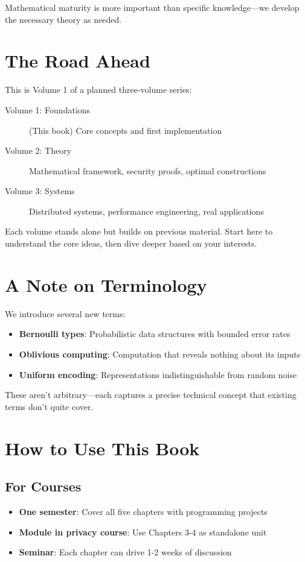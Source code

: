 Mathematical maturity is more important than specific knowledge—we develop the necessary theory as needed.

\section*{The Road Ahead}

This is Volume 1 of a planned three-volume series:

\begin{description}
\item[Volume 1: Foundations] (This book) Core concepts and first implementation
\item[Volume 2: Theory] Mathematical framework, security proofs, optimal constructions
\item[Volume 3: Systems] Distributed systems, performance engineering, real applications
\end{description}

Each volume stands alone but builds on previous material. Start here to understand the core ideas, then dive deeper based on your interests.

\section*{A Note on Terminology}

We introduce several new terms:
\begin{itemize}
\item \textbf{Bernoulli types}: Probabilistic data structures with bounded error rates
\item \textbf{Oblivious computing}: Computation that reveals nothing about its inputs
\item \textbf{Uniform encoding}: Representations indistinguishable from random noise
\end{itemize}

These aren't arbitrary—each captures a precise technical concept that existing terms don't quite cover.

\section*{How to Use This Book}

\subsection*{For Courses}
\begin{itemize}
\item \textbf{One semester}: Cover all five chapters with programming projects
\item \textbf{Module in privacy course}: Use Chapters 3-4 as standalone unit
\item \textbf{Seminar}: Each chapter can drive 1-2 weeks of discussion
\end{itemize}

